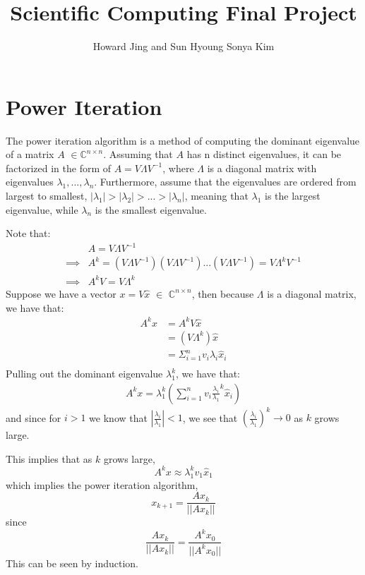 \documentclass[11pt]{amsart}
\title{Scientific Computing Final Project}
\author{Howard Jing and Sun Hyoung Sonya Kim}
\begin{document}
\maketitle
\section*{Power Iteration}
The power iteration algorithm is a method of computing the dominant eigenvalue of a matrix $A$ $\in \mathbb{C}^{n \times n}$. Assuming that $A$ has n distinct eigenvalues, it can be factorized in the form of $A = V \Lambda V^{-1}$, where $\Lambda$ is a diagonal matrix with eigenvalues $\lambda_1 ,..., \lambda_n$. Furthermore, assume that the eigenvalues are ordered from largest to smallest, $|\lambda_1| > |\lambda_2| > ... > |\lambda_n|$, meaning that $\lambda_1$ is the largest eigenvalue, while $\lambda_n$ is the smallest eigenvalue.

Note that: 
\begin{align*}
	&A = V\Lambda V^{-1} \\
	\implies &A^k = (V\Lambda V^{-1})(V\Lambda V^{-1})...(V\Lambda V^{-1}) = V\Lambda ^k V^{-1} \\	
	\implies &A^kV = V\Lambda ^k
\end{align*}
Suppose we have a vector $x = V \hat{x} $ $\in$ $\mathbb{C}^{n \times n}$, then because $\Lambda$ is a diagonal matrix, we have that:
\begin{align*}
	A^kx &= A^kV\hat{x} \\
	& = (V\Lambda ^k)\hat{x}  \\
	& = \Sigma^{n}_{i=1} v_i \lambda_i \hat{x}_i \\
\end{align*}
Pulling out the dominant eigenvalue $\lambda_1^k$, we have that:
\begin{align*}
	A^kx = \lambda_1^k(\sum_{i=1}^n v_i \frac{\lambda_i}{\lambda_1}^k \hat{x}_i)
\end{align*}
and since for $i > 1$ we know that $|\frac{\lambda_i}{\lambda_1}| < 1$, we see that $(\frac{\lambda_i}{\lambda_1})^k \rightarrow 0$ as $k$ grows large.

This implies that as $k$ grows large, 
\[ 
	A^k x \approx \lambda_1^k v_1 \hat{x}_1
\]
which implies the power iteration algorithm,
\[
	x_{k+1} = \frac{Ax_k}{||Ax_k||}
\]
since
\[
	\frac{Ax_k}{||Ax_k||} = \frac{A^kx_0}{||A^kx_0||}
\]
This can be seen by induction.
\end{document}
